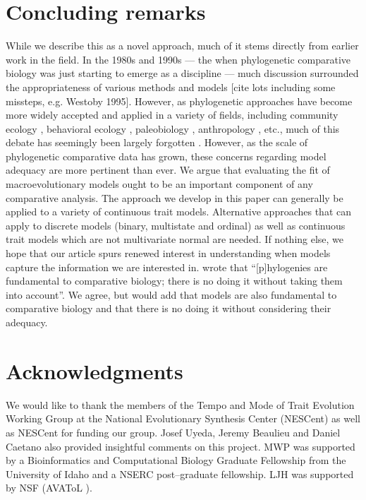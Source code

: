 \documentclass[12pt]{article}
\begin{document}
\section*{Concluding remarks}

While we describe this as a novel approach, much of it stems directly from earlier work in the field. In the 1980s and 1990s --- the when phylogenetic comparative biology was just starting to emerge as a discipline --- much discussion surrounded the appropriateness of various methods and models [cite lots including some missteps, e.g. Westoby 1995]. However, as phylogenetic approaches have become more widely accepted and applied in a variety of fields, including community ecology \citep{Green1993, AckerlyDonoghue1995, Webb2002, CB2009, PennellHarmon}, behavioral ecology \citep{something}, paleobiology \citep{something else}, anthropology \citep{Nunnbook}, etc., much of this debate has seemingly been largely forgotten \citep[but see][]{Losos2010}. However, as the scale of phylogenetic comparative data has grown, these concerns regarding model adequacy are more pertinent than ever. We argue that evaluating the fit of macroevolutionary models ought to be an important component of any comparative analysis. The approach we develop in this paper can generally be applied to a variety of continuous trait models. Alternative approaches that can apply to discrete models (binary, multistate and ordinal) as well as continuous trait models which are not multivariate normal are needed. If nothing else, we hope that our article spurs renewed interest in understanding when models capture the information we are interested in. \citet[][p. 14]{Felsenstein1985} wrote that ``[p]hylogenies are fundamental to comparative biology; there is no doing it without taking them into account''. We agree, but would add that models are also fundamental to comparative biology and that there is no doing it without considering their adequacy.


\section*{Acknowledgments}

We would like to thank the members of the Tempo and Mode of Trait Evolution Working Group at the National Evolutionary Synthesis Center (NESCent) as well as NESCent for funding our group. Josef Uyeda, Jeremy Beaulieu and Daniel Caetano also provided insightful comments on this project. MWP was supported by a Bioinformatics and Computational Biology Graduate Fellowship from the University of Idaho and a NSERC post--graduate fellowship. LJH was supported by NSF (AVAToL ).



\newpage


\end{document}
